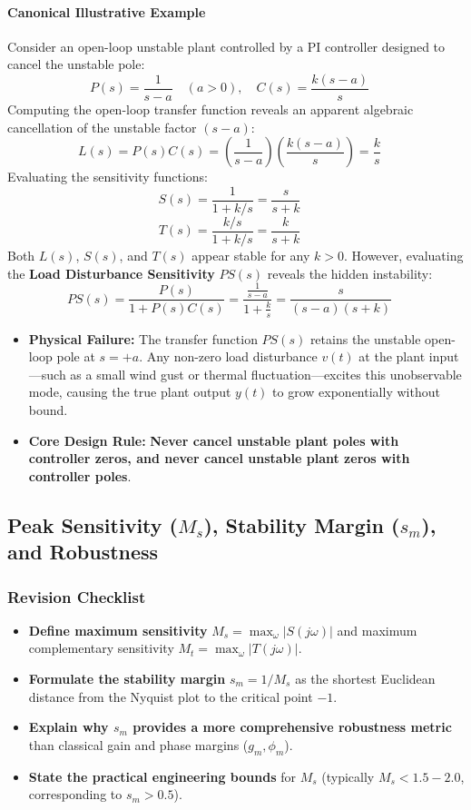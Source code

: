 \documentclass[12pt,onecolumn,twoside ]{article}
\begin{document}
	\paragraph{Canonical Illustrative Example}
	Consider an open-loop unstable plant controlled by a PI controller designed to cancel the unstable pole: \[
	P(s) = \frac{1}{s - a} \quad (a > 0), \quad C(s) = \frac{k(s - a)}{s} \quad
	\]
	Computing the open-loop transfer function reveals an apparent algebraic cancellation of the unstable factor $(s - a)$: \[
	L(s) = P(s)C(s) = \left(\frac{1}{s - a}\right) \left(\frac{k(s - a)}{s}\right) = \frac{k}{s} \quad
	\]
	Evaluating the sensitivity functions: \[
	S(s) = \frac{1}{1 + k/s} = \frac{s}{s + k} \quad
	\] \[
	T(s) = \frac{k/s}{1 + k/s} = \frac{k}{s + k} \quad
	\] Both $L(s)$, $S(s)$, and $T(s)$ appear stable for any $k > 0$. However, evaluating the \textbf{Load Disturbance Sensitivity} $PS(s)$ reveals the hidden instability: \[
	PS(s) = \frac{P(s)}{1 + P(s)C(s)} = \frac{\frac{1}{s - a}}{1 + \frac{k}{s}} = \frac{s}{(s - a)(s + k)} \quad
	\]
	\begin{itemize}
		\item
		\textbf{Physical Failure:} The transfer function $PS(s)$ retains the unstable open-loop pole at $s = +a$. Any non-zero load disturbance $v(t)$ at the plant input—such as a small wind gust or thermal fluctuation—excites this unobservable mode, causing the true plant output $y(t)$ to grow exponentially without bound.
		\item
		\textbf{Core Design Rule:} \textbf{Never cancel unstable plant poles with controller zeros, and never cancel unstable plant zeros with controller poles}.
	\end{itemize}
	
	\subsection{Peak Sensitivity ($M_s$), Stability Margin ($s_m$), and Robustness}
	\subsubsection{Revision Checklist}
	\begin{itemize}
		\item[$\square$]
		\textbf{Define maximum sensitivity} $M_s = \max_\omega |S(j\omega)|$ and maximum complementary sensitivity $M_t = \max_\omega |T(j\omega)|$.
		\item[$\square$]
		\textbf{Formulate the stability margin} $s_m = 1/M_s$ as the shortest Euclidean distance from the Nyquist plot to the critical point $-1$.
		\item[$\square$]
		\textbf{Explain why $s_m$ provides a more comprehensive robustness metric} than classical gain and phase margins ($g_m, \phi_m$).
		\item[$\square$]
		\textbf{State the practical engineering bounds} for $M_s$ (typically $M_s < 1.5 - 2.0$, corresponding to $s_m > 0.5$).
	\end{itemize}
	
\end{document}
